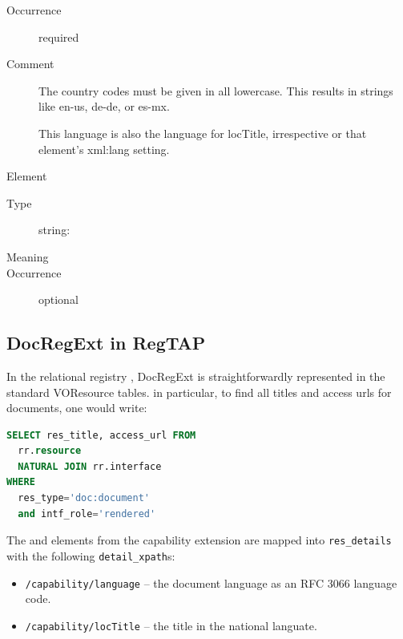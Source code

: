 \documentclass{ivoa}
\begin{document}
\begin{generated}
\begin{bigdescription}
\begin{description}
\item[Occurrence] required
\item[Comment] 
                The country codes must be given in all lowercase.  This
                results in strings like en-us, de-de, or es-mx.

                This language is also the language for locTitle, 
                irrespective or that element's xml:lang setting.
              

\end{description}
\item[Element \xmlel{locTitle}]
\begin{description}
\item[Type] string: 
\item[Meaning] 
\item[Occurrence] optional

\end{description}


\end{bigdescription}\endgroup

\endgroup
\end{generated}


\subsection{DocRegExt in RegTAP}
\label{sect:docregext-regtap}

In the relational registry \citep{2014ivoa.spec.1208D}, DocRegExt is
straightforwardly represented in the standard VOResource tables.  in
particular, to find all titles and access urls for documents, one would
write:

\begin{lstlisting}[language=SQL]
SELECT res_title, access_url FROM
  rr.resource 
  NATURAL JOIN rr.interface
WHERE
  res_type='doc:document'
  and intf_role='rendered'
\end{lstlisting}

The  and  elements from the
 capability extension are mapped into
\verb|res_details| with the following \verb|detail_xpath|s:

\begin{itemize}

\item \texttt{/capability/language} -- the document language as an RFC
3066 language code.
\item \texttt{/capability/locTitle} -- the title in the national
languate.
\end{itemize}
\end{document}
